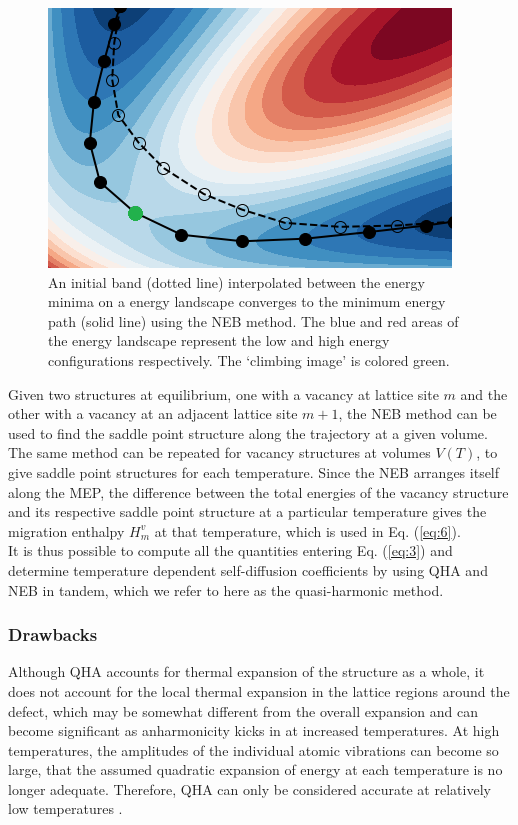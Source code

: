 \documentclass{article}
\begin{document}
\begin{figure}[htp]
\centering
\includegraphics[scale=1.2]{neb}
\caption{An initial band (dotted line) interpolated between the energy minima on a energy landscape converges to the minimum energy path (solid line) using the NEB method. The blue and red areas of the energy landscape represent the low and high energy configurations respectively. The \enquote*{climbing image} is colored green.}
 \label{fig:3}
\end{figure}

Given two structures at equilibrium, one with a vacancy at lattice site $m$ and the other with a vacancy at an adjacent lattice site $m+1$, the NEB method can be used to find the saddle point structure along the trajectory at a given volume. The same method can be repeated for vacancy structures at volumes $V(T)$, to give saddle point structures for each temperature. Since the NEB arranges itself along the MEP, the difference between the total energies of the vacancy structure and its respective saddle point structure at a particular temperature gives the migration enthalpy $H^v_m$ at that temperature, which is used in Eq. (\ref{eq:6}). \\

It is thus possible to compute all the quantities entering Eq. (\ref{eq:3}) and determine temperature dependent self-diffusion coefficients by using QHA and NEB in tandem, which we refer to here as the quasi-harmonic method.

\subsubsection{Drawbacks} 

\noindent Although QHA accounts for thermal expansion of the structure as a whole, it does not account for the local thermal expansion in the lattice regions around the defect, which may be somewhat different from the overall expansion and can become significant as anharmonicity kicks in at increased temperatures. At high temperatures, the amplitudes of the individual atomic vibrations can become so large, that the assumed quadratic expansion of energy at each temperature is no longer adequate. Therefore, QHA can only be considered accurate at relatively low temperatures \cite{Mendelev2009}.
\end{document}
